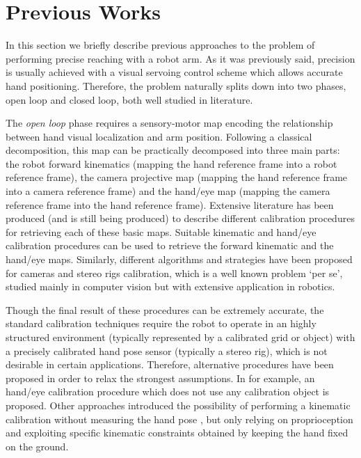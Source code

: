 \section{Previous Works}



In this section we briefly describe previous approaches to the problem of performing precise reaching with a robot arm. As it was previously said, precision is usually achieved with a visual servoing control scheme which allows accurate hand positioning. Therefore, the problem naturally splits down into two phases, open loop and closed loop, both well studied in literature.

The {\em open loop} phase requires a sensory-motor map encoding the relationship between hand visual localization and arm position. Following a classical decomposition, this map can be practically decomposed into three main parts: the robot forward kinematics (mapping the hand reference frame into a robot reference frame), the camera projective map (mapping the hand reference frame into a camera reference frame) and the hand/eye map (mapping the camera reference frame into the hand reference frame). Extensive literature has been produced (and is still being produced) to describe different calibration procedures for retrieving each of these basic maps. Suitable kinematic \cite{Hollerbach96calibration} and hand/eye \cite{Tsai88calibration} calibration procedures can be used to retrieve the forward kinematic and the hand/eye maps. Similarly, different algorithms and strategies have been proposed for cameras and stereo rigs calibration, which is a well known problem `per se', studied mainly in computer vision \cite{Soatto03vision} but with extensive application in robotics. 

Though the final result of these procedures can be extremely accurate, the standard calibration techniques require the robot to operate in an highly structured environment (typically represented by a calibrated grid or object) with a precisely calibrated hand pose sensor (typically a stereo rig), which is not desirable in certain applications. Therefore, alternative procedures have been proposed in order to relax the strongest assumptions. In \cite{AHE01} for example, an hand/eye calibration procedure which does not use any calibration object is proposed. Other approaches introduced the possibility of performing a kinematic calibration without measuring the hand pose \cite{Bennett91calibration}, but only relying on proprioception and exploiting specific kinematic constraints obtained by keeping the hand fixed on the ground. 

